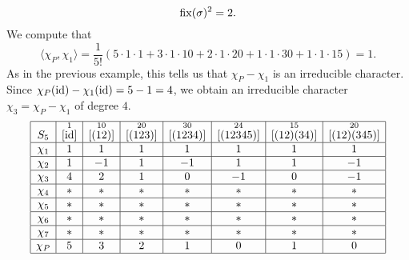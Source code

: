 \begin{exmp}{}
\[    \operatorname{fix}(\sigma)^2 = 2. \] 
    We compute that 
    \[ \langle \chi_P, \chi_1 \rangle = \frac1{5!} 
    (5 \cdot 1 \cdot 1 + 3 \cdot 1 \cdot 10 + 2 \cdot 1 \cdot 20 + 1 \cdot 1 \cdot 30
    + 1 \cdot 1 \cdot 15) = 1. \] 
    As in the previous example, this tells us that $\chi_P - \chi_1$ is an 
    irreducible character. Since $\chi_P(\operatorname{id}) - \chi_1(\operatorname{id}) = 5 - 1 = 4$, 
    we obtain an irreducible character $\chi_3 = \chi_P - \chi_1$ of degree $4$.
    \begin{align*}
        \begin{array}{|c|c|c|c|c|c|c|c|}
            \hline
            S_5    & \overset{1}{[\operatorname{id}]} & \overset{10}{[(12)]} & \overset{20}{[(123)]} & \overset{30}{[(1234)]} & \overset{24}{[(12345)]} & \overset{15}{[(12)(34)]} & \overset{20}{[(12)(345)]} \\ \hline
            \chi_1 & 1                  & 1                    & 1                     & 1                      & 1                       & 1                        & 1                         \\ \hline
            \chi_2 & 1                  & -1                   & 1                     & -1                     & 1                       & 1                        & -1                        \\ \hline
            \chi_3 & 4                  & 2                    & 1                     & 0                      & -1                      & 0                        & -1                        \\ \hline
            \chi_4 & *                  & *                    & *                     & *                      & *                       & *                        & *                         \\ \hline
            \chi_5 & *                  & *                    & *                     & *                      & *                       & *                        & *                         \\ \hline
            \chi_6 & *                  & *                    & *                     & *                      & *                       & *                        & *                         \\ \hline
            \chi_7 & *                  & *                    & *                     & *                      & *                       & *                        & *                         \\ \hline
            \chi_P & 5                  & 3                    & 2                     & 1                      & 0                       & 1                        & 0                         \\ \hline 

\end{array}
\end{align*}
\end{exmp}
